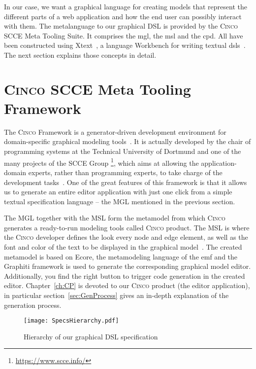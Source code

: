 In our case, we want a graphical language for creating models that represent the different parts of a web application and how the end user can possibly interact with them. The metalanguage to our graphical DSL is provided by the \textsc{Cinco} SCCE Meta Tooling Suite. It comprises the \gls{mgl}, the \gls{msl} and the \gls{cpd}. All have been constructed using Xtext~\cite{bettini2016implementing}, a language Workbench for writing textual \glspl*{dsl}~\cite{naujokat-diss}. The next section explains those concepts in detail.

\section{\textsc{Cinco SCCE} Meta Tooling Framework}\label{sec:cincoFW}


The \textsc{Cinco} Framework is a generator-driven development environment for domain-specific graphical modeling tools~\cite{Cinco}. It is actually developed by the chair of programming systems at the Technical University of Dortmund and one of the many projects of the SCCE Group \footnote[1]{\url{https://www.scce.info/}}, which aims at allowing the application-domain experts, rather than programming experts, to take charge of the development tasks~\cite{scce}. One of the great features of this framework is that it allows us to generate an entire editor application with just one click from a simple textual specification language -- the MGL mentioned in the previous section. 

The MGL together with the MSL form the metamodel from which \textsc{Cinco} generates a ready-to-run modeling tools called \textsc{Cinco} product. The MSL is where the \textsc{Cinco} developer defines the look every node and edge element, as well as the font and color of the text to be displayed in the graphical model~\cite{naujokat-diss}. The created metamodel is based on Ecore, the metamodeling language of the \gls{emf} and the Graphiti framework is used to generate the corresponding graphical model editor. Additionally, you find the right button to trigger code generation in the created editor. Chapter~\ref{ch:CP} is devoted to our \textsc{Cinco} product (the editor application), in particular section~\ref{sec:GenProcess} gives an in-depth explanation of the generation process.

\begin{figure}[h]
    \centering
    \texttt{[image: SpecsHierarchy.pdf]}
    \caption{Hierarchy of our graphical DSL specification}
    \label{fig:modeling-hierachy}
\end{figure}

